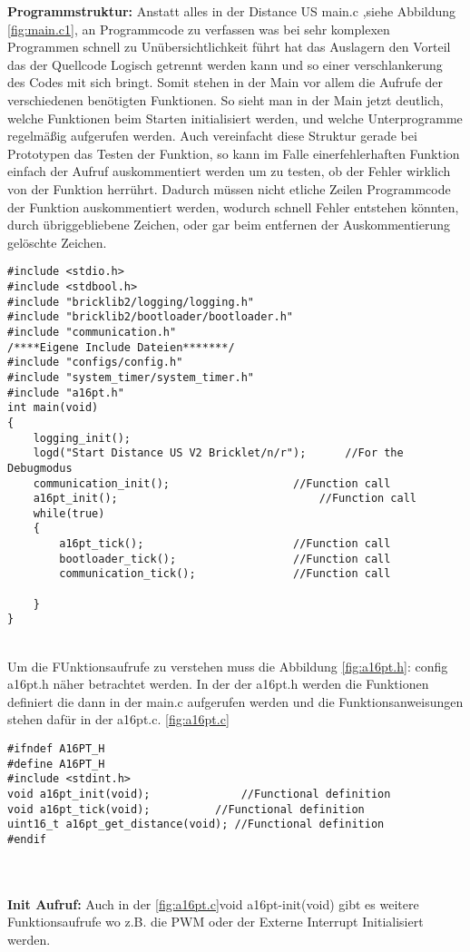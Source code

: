 \textbf{Programmstruktur:}
Anstatt alles in der Distance US main.c ,siehe Abbildung \ref{fig:main.c1}, an Programmcode zu verfassen was bei sehr komplexen Programmen schnell zu Unübersichtlichkeit führt hat das Auslagern den Vorteil das der Quellcode Logisch getrennt werden kann und so einer verschlankerung des Codes mit sich bringt. 
Somit stehen in der Main  vor allem die Aufrufe der verschiedenen benötigten Funktionen. So sieht man in der Main jetzt deutlich, welche Funktionen beim Starten initialisiert werden, und welche Unterprogramme regelmäßig aufgerufen werden. Auch vereinfacht diese Struktur gerade bei Prototypen das Testen der Funktion, so kann im Falle einerfehlerhaften Funktion einfach der Aufruf auskommentiert werden um zu testen, ob der Fehler wirklich von der Funktion herrührt. Dadurch müssen nicht etliche Zeilen Programmcode der Funktion auskommentiert werden, wodurch schnell Fehler entstehen könnten, durch übriggebliebene Zeichen, oder gar beim entfernen der Auskommentierung gelöschte Zeichen.\\
\begin{minipage}{1\textwidth}
\begin{lstlisting}
#include <stdio.h>
#include <stdbool.h>
#include "bricklib2/logging/logging.h"
#include "bricklib2/bootloader/bootloader.h"
#include "communication.h"
/****Eigene Include Dateien*******/
#include "configs/config.h"
#include "system_timer/system_timer.h"
#include "a16pt.h"
int main(void)
{ 
	logging_init(); 
	logd("Start Distance US V2 Bricklet/n/r");  	//For the Debugmodus
	communication_init(); 					//Function call
	a16pt_init(); 								//Function call	
	while(true)
	{
		a16pt_tick(); 						//Function call
		bootloader_tick(); 					//Function call
		communication_tick(); 				//Function call
		
	}
}
\end{lstlisting}
\label{fig:main.c1}
\end{minipage}\\
Um die FUnktionsaufrufe zu verstehen muss die Abbildung \ref{fig:a16pt.h}: config a16pt.h näher betrachtet werden.
In der der a16pt.h werden die Funktionen definiert die dann in der main.c aufgerufen werden und die Funktionsanweisungen stehen dafür in der a16pt.c. \ref{fig:a16pt.c}\\
\begin{minipage}{1\textwidth}
\begin{lstlisting}
#ifndef A16PT_H
#define A16PT_H
#include <stdint.h>
void a16pt_init(void);				//Functional definition
void a16pt_tick(void); 			//Functional definition
uint16_t a16pt_get_distance(void); //Functional definition
#endif
\end{lstlisting}
\label{fig:a16pt.h}
\end{minipage}\\
\\
\textbf{Init Aufruf:}
Auch in der \ref{fig:a16pt.c}void a16pt-init(void) gibt es weitere Funktionsaufrufe wo z.B. die PWM oder der Externe Interrupt Initialisiert werden.


